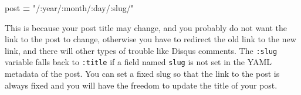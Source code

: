 \documentclass[12pt,]{krantz}
\makeatletter
\newenvironment{Shaded}{\begin{snugshade}}{\end{snugshade}}
\newcommand{\StringTok}[1]{\textcolor[rgb]{0.31,0.60,0.02}{#1}}
\newcommand{\OperatorTok}[1]{\textcolor[rgb]{0.81,0.36,0.00}{\textbf{#1}}}
\newcommand{\NormalTok}[1]{#1}
\newenvironment{kframe}{%
\medskip{}
\setlength{\fboxsep}{.8em}
 \def\at@end@of@kframe{}%
 \ifinner\ifhmode%
  \def\at@end@of@kframe{\end{minipage}}%
  \begin{minipage}{\columnwidth}%
 \fi\fi%
 \def\FrameCommand##1{\hskip\@totalleftmargin \hskip-\fboxsep
 \colorbox{shadecolor}{##1}\hskip-\fboxsep
     \hskip-\linewidth \hskip-\@totalleftmargin \hskip\columnwidth}%
 \MakeFramed {\advance\hsize-\width
   \@totalleftmargin\z@ \linewidth\hsize
   \@setminipage}}%
 {\par\unskip\endMakeFramed%
 \at@end@of@kframe}
\renewenvironment{Shaded}{\begin{kframe}}{\end{kframe}}
\theoremstyle{definition}
\theoremstyle{definition}
\theoremstyle{definition}
\theoremstyle{remark}
\makeatother
\begin{document}
\begin{itemize}
\begin{Shaded}
\begin{Highlighting}[]
\NormalTok{[permalinks]}
\NormalTok{    post }\OperatorTok{=} \StringTok{"/:year/:month/:day/:slug/"}
\end{Highlighting}
\end{Shaded}

  This is because your post title may change, and you probably do not
  want the link to the post to change, otherwise you have to redirect
  the old link to the new link, and there will other types of trouble
  like Disqus comments. The \texttt{:slug} variable falls back to
  \texttt{:title} if a field named \texttt{slug} is not set in the YAML
  metadata of the post. You can set a fixed slug so that the link to the
  post is always fixed and you will have the freedom to update the title
  of your post.


\end{itemize}
\end{document}
